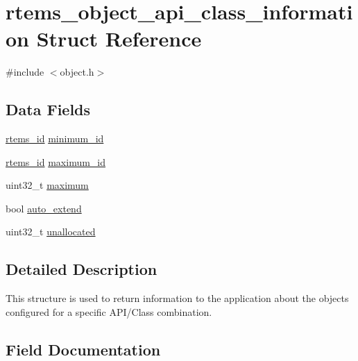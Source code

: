 \hypertarget{structrtems__object__api__class__information}{}\section{rtems\+\_\+object\+\_\+api\+\_\+class\+\_\+information Struct Reference}
\label{structrtems__object__api__class__information}


{\ttfamily \#include $<$object.\+h$>$}

\subsection*{Data Fields}
\begin{DoxyCompactItemize}
\item 
\mbox{\hyperlink{group__ClassicTasks_gab20892b814dced7dd4e5b9bf42becd57}{rtems\+\_\+id}} \mbox{\hyperlink{structrtems__object__api__class__information_a8c69f070e857c76475f7b40fd1657552}{minimum\+\_\+id}}
\item 
\mbox{\hyperlink{group__ClassicTasks_gab20892b814dced7dd4e5b9bf42becd57}{rtems\+\_\+id}} \mbox{\hyperlink{structrtems__object__api__class__information_a0de5ee283c5e39ec8761e0729dd1f7f0}{maximum\+\_\+id}}
\item 
uint32\+\_\+t \mbox{\hyperlink{structrtems__object__api__class__information_a8276d1cadf456cacaf496af9a0e616be}{maximum}}
\item 
bool \mbox{\hyperlink{structrtems__object__api__class__information_ac388a2257b92d4adc8aa7a437c613a98}{auto\+\_\+extend}}
\item 
uint32\+\_\+t \mbox{\hyperlink{structrtems__object__api__class__information_a3af6e877ce2b011d34a92a9c1cc51b06}{unallocated}}
\end{DoxyCompactItemize}


\subsection{Detailed Description}
This structure is used to return information to the application about the objects configured for a specific A\+P\+I/\+Class combination. 

\subsection{Field Documentation}
\mbox{\label{structrtems__object__api__class__information_ac388a2257b92d4adc8aa7a437c613a98}} 
